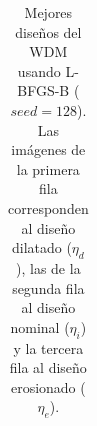 \begin{table}[ht]
\begin{tabular}{|c|c|c|}
    \hline
    \end{tabular}
    \hspace*{-3cm}
    \caption{Mejores diseños del WDM usando L-BFGS-B ($seed = 128$). 
    Las imágenes de la primera fila corresponden al diseño dilatado ($\eta_d$), 
    las de la segunda fila al diseño nominal ($\eta_i$) y la tercera fila al diseño erosionado ($\eta_e$).}
    \label{tab:best-bend-L-BFGS-B}
\end{table}

